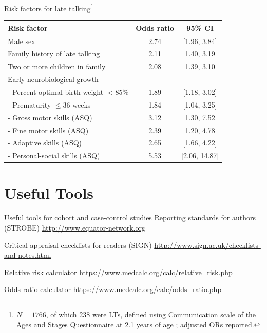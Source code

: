 \documentclass{beamer}
\begin{document}
\begin{frame}{Risk factors for late talking\footnote{\tiny{$N = 1766$, of which 238 were LTs, defined using Communication scale of the Ages and Stages Questionnaire at 2.1 years of age \citep[Table 3]{Zubrick2007}; adjusted ORs reported.}}}
	\begin{table}
	\centering
	\begin{tabular}{ l c c }
	\toprule
	Risk factor & Odds ratio & 95\% CI \\
	\midrule
	Male sex & 2.74 & [1.96, 3.84] \\
	Family history of late talking & 2.11 & [1.40, 3.19] \\
	Two or more children in family & 2.08 & [1.39, 3.10] \\
	Early neurobiological growth & & \\
	- Percent optimal birth weight $<85\%$ & 1.89 & [1.18, 3.02] \\
	- Prematurity $\leq 36$ weeks & 1.84 & [1.04, 3.25] \\
	- Gross motor skills (ASQ) & 3.12 & [1.30, 7.52] \\
	- Fine motor skills (ASQ) & 2.39 & [1.20, 4.78] \\
	- Adaptive skills (ASQ) & 2.65 & [1.66, 4.22] \\
	- Personal-social skills (ASQ) & 5.53 & [2.06, 14.87] \\
	\bottomrule
	\end{tabular} 
	\end{table}
\end{frame}

\section{Useful Tools}

\begin{frame}{Useful tools for cohort and case-control studies}
	\alert{Reporting standards for authors (STROBE)} \url{http://www.equator-network.org}
	
\vspace{3mm}
	\alert{Critical appraisal checklists for readers (SIGN)} \url{http://www.sign.ac.uk/checklists-and-notes.html}
	
\vspace{3mm}
	\alert{Relative risk calculator} \url{https://www.medcalc.org/calc/relative_risk.php}

\vspace{3mm}
	\alert{Odds ratio calculator} \url{https://www.medcalc.org/calc/odds_ratio.php}
\end{frame}
\end{document}
